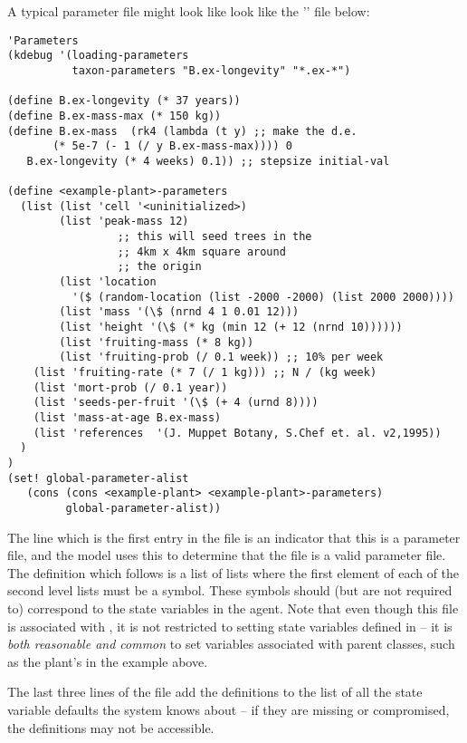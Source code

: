 A typical parameter file might look
like look like the '' file below:
\label{parameters}\label{kdebug}
\begin{verbatim}
'Parameters
(kdebug '(loading-parameters 
          taxon-parameters "B.ex-longevity" "*.ex-*") 

(define B.ex-longevity (* 37 years))
(define B.ex-mass-max (* 150 kg))
(define B.ex-mass  (rk4 (lambda (t y) ;; make the d.e.
       (* 5e-7 (- 1 (/ y B.ex-mass-max)))) 0
   B.ex-longevity (* 4 weeks) 0.1)) ;; stepsize initial-val

(define <example-plant>-parameters
  (list (list 'cell '<uninitialized>)
        (list 'peak-mass 12)
                 ;; this will seed trees in the
                 ;; 4km x 4km square around
                 ;; the origin
        (list 'location 
          '($ (random-location (list -2000 -2000) (list 2000 2000))))
        (list 'mass '(\$ (nrnd 4 1 0.01 12)))
        (list 'height '(\$ (* kg (min 12 (+ 12 (nrnd 10))))))
        (list 'fruiting-mass (* 8 kg))
        (list 'fruiting-prob (/ 0.1 week)) ;; 10% per week
    (list 'fruiting-rate (* 7 (/ 1 kg))) ;; N / (kg week)
    (list 'mort-prob (/ 0.1 year))
    (list 'seeds-per-fruit '(\$ (+ 4 (urnd 8))))
    (list 'mass-at-age B.ex-mass)
    (list 'references  '(J. Muppet Botany, S.Chef et. al. v2,1995))
  )
)
(set! global-parameter-alist 
   (cons (cons <example-plant> <example-plant>-parameters) 
         global-parameter-alist))
\end{verbatim}

The  line which is the first entry in the file is
an indicator that this is a parameter file, and the model 
uses this to determine that the file is a valid parameter file.
The definition which follows is a list of lists where the first
element of each of the second level lists must be a symbol.  These
symbols should (but are not required to) correspond to the state
variables in the agent. Note that even though this file is associated
with , it is not restricted to setting state
variables defined in  -- it is \emph{both reasonable
  and common} to set variables associated with parent classes, such as
the plant's  in the example above.

The last three lines of the file add the definitions to the list of
all the state variable defaults the system knows about -- if they are
missing or compromised, the definitions may not be accessible.

